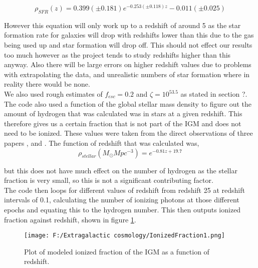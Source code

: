 \documentclass{article}
\begin{document}
\begin{equation}
\rho_{SFR}(z)=0.399(\pm0.181)e^{-0.253(\pm0.118)z}-0.011(\pm0.025)
\end{equation}

However this equation will only work up to a redshift of around 5 as the star formation rate for galaxies will drop with redshifts lower than this due to the gas being used up and star formation will drop off. This should not effect our results too much however as the project tends to study redshifts higher than this anyway. Also there will be large errors on higher redshift values due to problems with extrapolating the data, and unrealistic numbers of star formation where in reality there would be none.\\
We also used rough estimates of $f_{esc}=0.2$ and $\zeta=10^{53.5}$ as stated in section ?.\\

The code also used a function of the global stellar mass density to figure out the amount of hydrogen that was calculated was in stars at a given redshift. This therefore gives us a certain fraction that is not part of the IGM and does not need to be ionized. These values were taken from the direct observations of three papers \cite{2006A&A...459..745F}, \cite{2003A&A...401...73W} and \cite{2003ApJS..149..289B}. The function of redshift that was calculated was,\\

\begin{equation}
\rho_{stellar}(M_{\odot}Mpc^{-3})=e^{-0.81z+19.7}
\end{equation}

but this does not have much effect on the number of hydrogen as the stellar fraction is very small, so this is not a significant contributing factor.\\

The code then loops for different values of redshift from redshift 25 at redshift intervals of 0.1, calculating the number of ionizing photons at those different epochs and equating this to the hydrogen number. This then outputs ionized fraction against redshift, shown in figure \ref{fig:IonizedFraction1}.\\

\begin{figure}
	\centering
		\texttt{[image: F:/Extragalactic cosmology/IonizedFraction1.png]}
		\caption{Plot of modeled ionized fraction of the IGM as a function of redshift.} 
	\label{fig:IonizedFraction1}
\end{figure}
\end{document}
